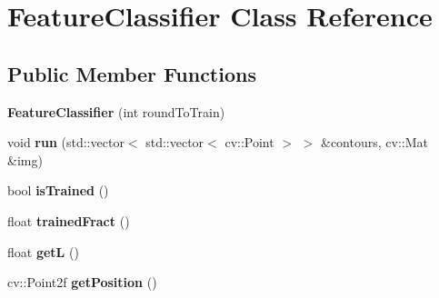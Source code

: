 \hypertarget{classFeatureClassifier}{\section{Feature\-Classifier Class Reference}
\label{classFeatureClassifier}
}
\subsection*{Public Member Functions}
\begin{DoxyCompactItemize}
\item 
\hypertarget{classFeatureClassifier_adc9bc89baf4d4abe675c6b1955d188c0}{{\bfseries Feature\-Classifier} (int round\-To\-Train)}\label{classFeatureClassifier_adc9bc89baf4d4abe675c6b1955d188c0}

\item 
\hypertarget{classFeatureClassifier_a3667ca84e2ab7e05becb01dc1b2e4e17}{void {\bfseries run} (std\-::vector$<$ std\-::vector$<$ cv\-::\-Point $>$ $>$ \&contours, cv\-::\-Mat \&img)}\label{classFeatureClassifier_a3667ca84e2ab7e05becb01dc1b2e4e17}

\item 
\hypertarget{classFeatureClassifier_ad01ef2cbf47cb4ad255c26a4ddbbd1f4}{bool {\bfseries is\-Trained} ()}\label{classFeatureClassifier_ad01ef2cbf47cb4ad255c26a4ddbbd1f4}

\item 
\hypertarget{classFeatureClassifier_a4c21690cf961f1023b6d1601c8b32a23}{float {\bfseries trained\-Fract} ()}\label{classFeatureClassifier_a4c21690cf961f1023b6d1601c8b32a23}

\item 
\hypertarget{classFeatureClassifier_aba2276bc6553b11f08139f8d0586c763}{float {\bfseries get\-L} ()}\label{classFeatureClassifier_aba2276bc6553b11f08139f8d0586c763}

\item 
\hypertarget{classFeatureClassifier_a3f52d77c51b43935faddfcd1db02dcc6}{cv\-::\-Point2f {\bfseries get\-Position} ()}\label{classFeatureClassifier_a3f52d77c51b43935faddfcd1db02dcc6}

\end{DoxyCompactItemize}
